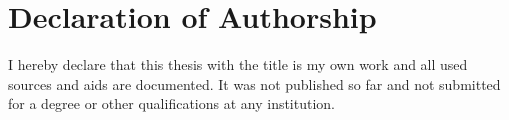 
\chapter*{Declaration of Authorship}

I hereby declare that this thesis with the title \emph{\@title} is my own work and all used sources and aids are documented.
It was not published so far and not submitted for a degree or other qualifications at any institution.

\vspace{1cm}
\makebox[.45\textwidth][l]{\myplace, \@date}\makebox[.1\textwidth]{}\makebox[.45\textwidth][c]{\hrulefill}
\\
\makebox[.45\textwidth][l]{}\makebox[.1\textwidth]{}\makebox[.45\textwidth][c]{\@author}